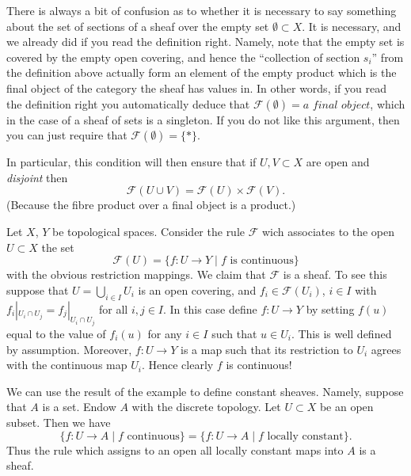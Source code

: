 \begin{remark}
\label{remark-confusion}
There is always a bit of confusion as to whether it is
necessary to say something about the set of sections of
a sheaf over the empty set $\emptyset \subset X$.
It is necessary, and we already did if you read the
definition right. Namely, note that the empty set is
covered by the empty open covering, and hence the ``collection
of section $s_i$'' from the definition above actually form
an element of the empty product which is the final object
of the category the sheaf has values in. In other words,
if you read the definition right you automatically deduce
that $\mathcal{F}(\emptyset) = \textit{a final object}$,
which in the case of a sheaf of sets is a singleton.
If you do not like this argument, then you can just require
that $\mathcal{F}(\emptyset) = \{*\}$.

\medskip\noindent
In particular, this condition will then ensure that if
$U, V \subset X$ are open and {\it disjoint} then
$$
\mathcal{F}(U \cup V) = \mathcal{F}(U) \times \mathcal{F}(V).
$$
(Because the fibre product over a final object is a product.)
\end{remark}

\begin{example}
\label{example-basic-continuous-maps}
Let $X$, $Y$ be topological spaces.
Consider the rule $\mathcal{F}$ wich associates to
the open $U \subset X$ the set
$$
\mathcal{F}(U) = \{ f : U \to Y \mid f \text{ is continuous}\}
$$
with the obvious restriction mappings. We claim that
$\mathcal{F}$ is a sheaf. To see this suppose that
$U = \bigcup_{i\in I} U_i$ is an open covering, and
$f_i \in \mathcal{F}(U_i)$, $i\in I$ with
$f_i |_{U_i \cap U_j} = f_j|_{U_i \cap U_j}$ for all $i, j \in I$.
In this case define $f : U \to Y$ by setting $f(u)$
equal to the value of $f_i(u)$ for any $i \in I$ such that
$u \in U_i$. This is well defined by assumption. Moreover,
$f : U \to Y$ is a map such that its restriction to $U_i$
agrees with the continuous map $U_i$. Hence clearly $f$ is
continuous!
\end{example}

\noindent
We can use the result of the example to define constant
sheaves. Namely, suppose that $A$ is a set. Endow $A$ with
the discrete topology. Let $U \subset X$ be an open subset.
Then we have
$$
\{ f : U \to A \mid f\text{ continuous}\}
=
\{ f : U \to A \mid f\text{ locally constant}\}.
$$
Thus the rule which assigns to an open all locally
constant maps into $A$ is a sheaf.

